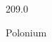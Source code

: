 \documentclass[12pt]{article}
\begin{document}
\hfill{}
\vfill
\begin{center}
  {\fontsize{50}{60}
  }

  \vspace{1em}

  209.0

Polonium
\end{center}
\vfill
\end{document}
